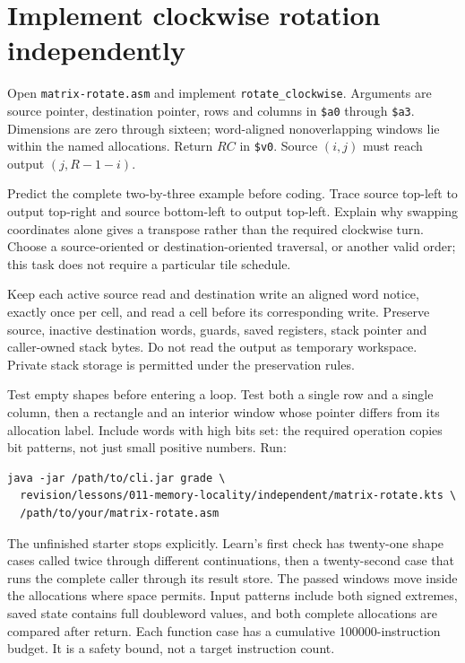 \section{Implement clockwise rotation independently}

Open \texttt{matrix-rotate.asm} and implement \texttt{rotate\_clockwise}. Arguments
are source pointer, destination pointer, rows and columns in
\texttt{\$a0} through \texttt{\$a3}. Dimensions are zero through sixteen;
word-aligned nonoverlapping windows lie within the named allocations. Return
$RC$ in \texttt{\$v0}. Source $(i,j)$ must reach output $(j,R-1-i)$.

Predict the complete two-by-three example before coding. Trace source top-left
to output top-right and source bottom-left to output top-left. Explain why swapping
coordinates alone gives a transpose rather than the required clockwise turn.
Choose a source-oriented or destination-oriented traversal, or another valid order;
this task does not require a particular tile schedule.

Keep each active source read and destination write an aligned word notice, exactly
once per cell, and read a cell before its corresponding write. Preserve source,
inactive destination words, guards, saved registers, stack pointer and caller-owned
stack bytes. Do not read the output as temporary workspace. Private stack storage
is permitted under the preservation rules.

Test empty shapes before entering a loop. Test both a single row and a single
column, then a rectangle and an interior window whose pointer differs from its
allocation label. Include words with high bits set: the required operation copies
bit patterns, not just small positive numbers. Run:
\noindent\begin{minipage}{\linewidth}
  \begin{verbatim}
java -jar /path/to/cli.jar grade \
  revision/lessons/011-memory-locality/independent/matrix-rotate.kts \
  /path/to/your/matrix-rotate.asm
\end{verbatim}
\end{minipage}
The unfinished starter stops explicitly. Learn's first check has twenty-one
shape cases called twice through different continuations, then a twenty-second
case that runs the complete caller through its result store. The passed windows
move inside the allocations where space permits. Input patterns include both
signed extremes, saved state contains full doubleword values, and both complete
allocations are compared after return. Each function case has a cumulative
100000-instruction budget. It is a safety bound, not a target instruction count.


